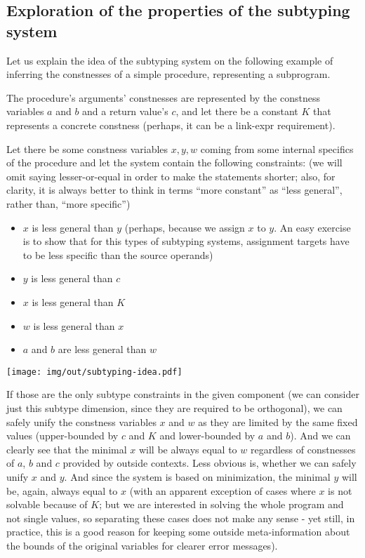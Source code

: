 \subsection{Exploration of the properties of the subtyping system}
\label{subtyping-idea}

Let us explain the idea of the subtyping system on the following example of inferring the constnesses of a simple procedure, representing a subprogram.

The procedure's arguments' constnesses are represented by the constness variables $a$ and $b$ and a return value's $c$, and let there be a constant $K$ that represents a concrete constness (perhaps, it can be a link-expr requirement).

Let there be some constness variables $x, y, w$ coming from some internal specifics of the procedure and let the system contain the following constraints: (we will omit saying lesser-or-equal in order to make the statements shorter; also, for clarity, it is always better to think in terms ``more constant'' as ``less general'', rather than, ``more specific'')

\begin{itemize}
    \item $x$ is less general than $y$ (perhaps, because we assign $x$ to $y$. An easy exercise is to show that for this types of subtyping systems, assignment targets have to be less specific than the source operands)
    \item $y$ is less general than $c$
    \item $x$ is less general than $K$
    \item $w$ is less general than $x$
    \item $a$ and $b$ are less general than $w$
\end{itemize}

\centerline{\texttt{[image: img/out/subtyping-idea.pdf]}}

If those are the only subtype constraints in the given component (we can consider just this subtype dimension, since they are required to be orthogonal), we can safely unify the constness variables $x$ and $w$ as they are limited by the same fixed values (upper-bounded by $c$ and $K$ and lower-bounded by $a$ and $b$). And we can clearly see that the minimal $x$ will be always equal to $w$ regardless of constnesses of $a$, $b$ and $c$ provided by outside contexts. Less obvious is, whether we can safely unify $x$ and $y$. And since the system is based on minimization, the minimal $y$ will be, again, always equal to $x$ (with an apparent exception of cases where $x$ is not solvable because of $K$; but we are interested in solving the whole program and not single values, so separating these cases does not make any sense - yet still, in practice, this is a good reason for keeping some outside meta-information about the bounds of the original variables for clearer error messages).

